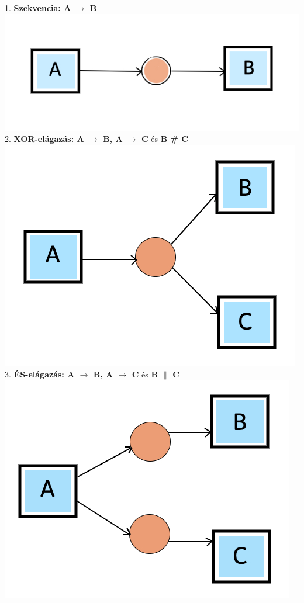 1. \textbf{Szekvencia: A $\rightarrow$ B}\\
\includegraphics[width=8truecm, height=4truecm]{images/img_alpha_seq}\\
2. \textbf{XOR-elágazás: A $\rightarrow$ B, A $\rightarrow$ C} és \textbf{B \# C}\\
\includegraphics[width=8truecm, height=6truecm]{images/img_alpha_xor}\\
3. \textbf{ÉS-elágazás: A $\rightarrow$ B, A $\rightarrow$ C} és \textbf{B $\parallel$ C}\\
\includegraphics[width=8truecm, height=6truecm]{images/img_alpha_and}\\

